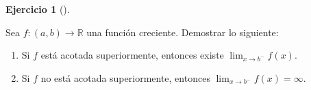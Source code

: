 \documentclass[
  a4paper,
]{scrreport}
\providecommand{\tightlist}{%
  \setlength{\itemsep}{0pt}\setlength{\parskip}{0pt}}\usepackage{longtable,booktabs,array}
\theoremstyle{definition}
\newtheorem{exercise}{Ejercicio}[chapter]
\theoremstyle{remark}
\begin{document}
\leavevmode{}%
\begin{exercise}[]\label{exr-limites-funciones-acotadas}

Sea \(f:(a,b)\to \mathbb{R}\) una función creciente. Demostrar lo
siguiente:

\begin{enumerate}
\def\labelenumi{\alph{enumi}.}
\tightlist
\item
  Si \(f\) está acotada superiormente, entonces existe
  \(\lim_{x\to b^-}f(x)\).
\item
  Si \(f\) no está acotada superiormente, entonces
  \(\lim_{x\to b^-}f(x)=\infty\).
\end{enumerate}

\end{exercise}
\end{document}
